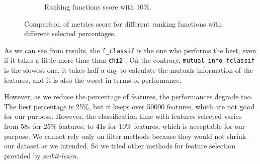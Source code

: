 \begin{figure}[]
\begin{subfigure}[t]{0.48\textwidth}
		\caption{Ranking functions score with 10\%.}\label{fig:ranking10}
	\end{subfigure}
	\caption{Comparison of metrics score for different ranking functions with different selected percentages.}\label{fig:ranking}
\end{figure}

As we can see from results, the \texttt{f\_classif} is the one who performs the best, even if it takes a little more time than \texttt{chi2} . On the contrary, \texttt{mutual\_info\_fclassif} is the slowest one, it takes half a day to calculate the mutuals information of the features, and it is also the worst in terms of performance.

However, as we reduce the percentage of features, the performances degrade too. The best percentage is 25\%, but it keeps over 50000 features, which are not good for our purpose. However, the classification time with features selected varies from 58s for 25\% features, to 41s for 10\% features, which is acceptable for our purpose. 
We cannot rely only on filter methods because they would not shrink our dataset as we intended. So we tried other methods for feature selection provided by \textit{scikit-learn}.




